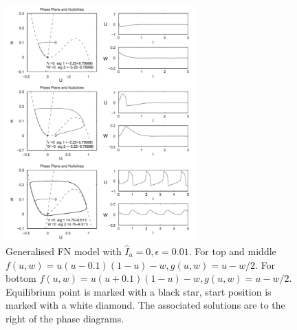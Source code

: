     \begin{figure}
        \centering
        \includegraphics[width=0.65\textwidth]{images/I0cycles.png}
        \caption{Generalised FN model with $\hat I_a = 0, \epsilon=0.01$. For top and middle $f(u,w) = u(u-0.1)(1-u)-w, g(u,w)=u-w/2$. For bottom $f(u,w) = u(u+0.1)(1-u)-w, g(u,w)=u-w/2$. Equilibrium point is marked with a black star, start position is marked with a white diamond. The associated solutions are to the right of the phase diagrams. \citep{ecg}}
        \label{fig2b.2}
    \end{figure}
